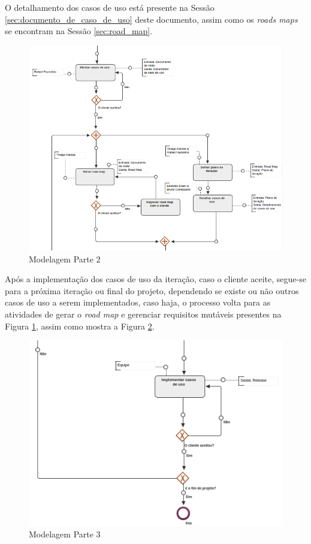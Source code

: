 O detalhamento dos casos de uso está presente na Sessão \ref{sec:documento_de_caso_de_uso} deste documento, assim como os \textit{roads maps} se encontram na Sessão \ref{sec:road_map}.

\begin{figure}[H]
	\centering
	\includegraphics[width=1\textwidth]{imgModelagem/modelagem2}
	\caption{Modelagem Parte 2}
	\label{img:modelagem2}
\end{figure}

Após a implementação dos casos de uso da iteração, caso o cliente aceite, segue-se para a próxima iteração ou final do projeto, dependendo se existe ou não outros casos de uso a serem implementados, caso haja, o processo volta para as atividades de gerar o \textit{road map}  e gerenciar requisitos mutáveis presentes na Figura \ref{img:modelagem2}, assim como mostra a Figura \ref{img:modelagem3}.

\begin{figure}[H]
	\centering
	\includegraphics[width=1\textwidth]{imgModelagem/modelagem3}
	\caption{Modelagem Parte 3}
	\label{img:modelagem3}
\end{figure}
